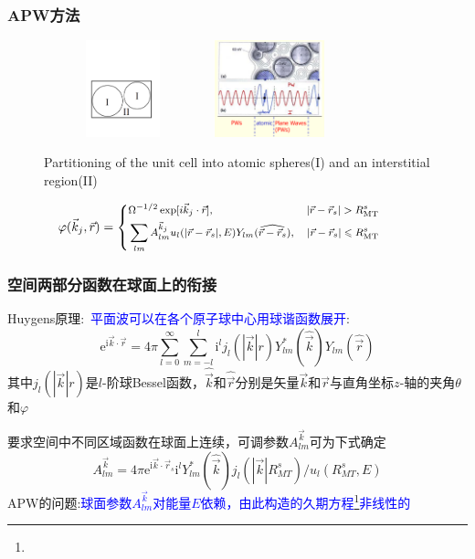 \frame
{
\frametitle{\textrm{APW}方法}
\begin{figure}[h!]
\centering
\includegraphics[height=1.10in,width=1.80in,viewport=40 150 545 465,clip]{Figures/Muffin_tin.pdf}
\includegraphics[height=1.10in,width=1.45in,viewport=1 20 485 435,clip]{Figures/APW.png}
\caption{\tiny \textrm{Partitioning of the unit cell into atomic spheres(I) and an interstitial region(II)}}%
\label{Muffin_tin-2}
\end{figure}
\begin{displaymath}
\hskip -28pt\footnotesize \varphi(\vec k_j,\vec r)=\left\{
  \begin{aligned}
    &\Omega^{-1/2}\exp[i\vec k_j\cdot\vec r],&|\vec r-\vec r_s|>R_{\mathrm{MT}}^s\\
    &\sum_{lm}A_{lm}^{\vec k_j}u_l(|\vec r-\vec r_s|,E)Y_{lm}(\widehat{\vec r-\vec r_s}),&|\vec r-\vec r_s|\leqslant R_{\mathrm{MT}}^s
  \end{aligned}
\right.
\end{displaymath}
}

\frame
{
	\frametitle{空间两部分函数在球面上的衔接}
	\textrm{Huygens}原理:~\textcolor{blue}{平面波可以在各个原子球中心用球谐函数展开}:
	\begin{displaymath}
		\mathrm{e}^{\mathrm{i}\vec k\cdot\vec r}=4\pi\sum_{l=0}^{\infty}\sum_{m=-l}^l\mathrm{i}^lj_l(|\vec k|r)Y_{lm}^{\ast}(\hat{\vec k})Y_{lm}(\hat{\vec r})
	\end{displaymath}
	其中$j_l(|\vec k|r)$是$l$-阶球\textrm{Bessel}函数，$\hat{\vec k}$和$\hat{\vec r}$分别是矢量$\vec k$和$\vec r$与直角坐标$z$-轴的夹角$\theta$和$\varphi$

	要求空间中不同区域函数在球面上连续，可调参数$A_{lm}^{\vec k}$可为下式确定
\begin{displaymath}
	A_{lm}^{\vec k}=4\pi\mathrm{e}^{\mathrm{i}\vec k\cdot\vec r_s}\mathrm{i}^lY_{lm}^{\ast}(\hat{\vec k})j_l(|\vec k|R_{MT}^s)/u_l(R_{MT}^s,E)
\end{displaymath}
\textrm{APW}的问题:\textcolor{blue}{球面参数$A_{lm}^{\vec k}$对能量$E$依赖，由此构造的久期方程\footnote{\fontsize{7.2pt}{6.2pt}}非线性的}
}

